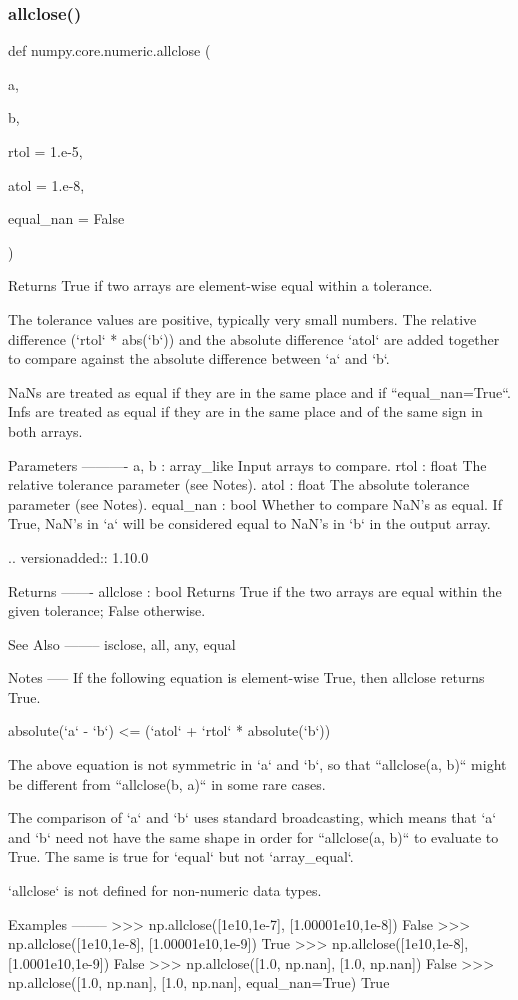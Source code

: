 \subsubsection{\texorpdfstring{allclose()}{allclose()}}
{\footnotesize\ttfamily def numpy.\+core.\+numeric.\+allclose (\begin{DoxyParamCaption}\item[{}]{a,  }\item[{}]{b,  }\item[{}]{rtol = {\ttfamily 1.e-\/5},  }\item[{}]{atol = {\ttfamily 1.e-\/8},  }\item[{}]{equal\+\_\+nan = {\ttfamily False} }\end{DoxyParamCaption})}

\begin{DoxyVerb}Returns True if two arrays are element-wise equal within a tolerance.

The tolerance values are positive, typically very small numbers.  The
relative difference (`rtol` * abs(`b`)) and the absolute difference
`atol` are added together to compare against the absolute difference
between `a` and `b`.

NaNs are treated as equal if they are in the same place and if
``equal_nan=True``.  Infs are treated as equal if they are in the same
place and of the same sign in both arrays.

Parameters
----------
a, b : array_like
    Input arrays to compare.
rtol : float
    The relative tolerance parameter (see Notes).
atol : float
    The absolute tolerance parameter (see Notes).
equal_nan : bool
    Whether to compare NaN's as equal.  If True, NaN's in `a` will be
    considered equal to NaN's in `b` in the output array.

    .. versionadded:: 1.10.0

Returns
-------
allclose : bool
    Returns True if the two arrays are equal within the given
    tolerance; False otherwise.

See Also
--------
isclose, all, any, equal

Notes
-----
If the following equation is element-wise True, then allclose returns
True.

 absolute(`a` - `b`) <= (`atol` + `rtol` * absolute(`b`))

The above equation is not symmetric in `a` and `b`, so that
``allclose(a, b)`` might be different from ``allclose(b, a)`` in
some rare cases.

The comparison of `a` and `b` uses standard broadcasting, which
means that `a` and `b` need not have the same shape in order for
``allclose(a, b)`` to evaluate to True.  The same is true for
`equal` but not `array_equal`.

`allclose` is not defined for non-numeric data types.

Examples
--------
>>> np.allclose([1e10,1e-7], [1.00001e10,1e-8])
False
>>> np.allclose([1e10,1e-8], [1.00001e10,1e-9])
True
>>> np.allclose([1e10,1e-8], [1.0001e10,1e-9])
False
>>> np.allclose([1.0, np.nan], [1.0, np.nan])
False
>>> np.allclose([1.0, np.nan], [1.0, np.nan], equal_nan=True)
True\end{DoxyVerb}
